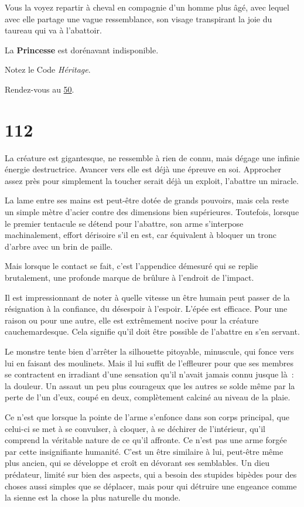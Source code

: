 \documentclass{report}
\newcommand{\gsection}[1]{
    \section{#1}
    \label{section-#1}
}
\newcommand{\glink}[1]{\hyperref[section-#1]{#1}}
\newcommand{\hero}[1]{\textbf{#1}}
\begin{document}
Vous la voyez repartir à cheval en compagnie d'un homme plus âgé, avec lequel avec elle partage une vague ressemblance, son visage transpirant la joie du taureau qui va à l'abattoir.

La \hero{Princesse} est dorénavant indisponible.

Notez le Code \emph{Héritage}.

Rendez-vous au \glink{50}.

\gsection{112}

La créature est gigantesque, ne ressemble à rien de connu, mais dégage une infinie énergie destructrice. Avancer vers elle est déjà une épreuve en soi. Approcher assez près pour simplement la toucher serait déjà un exploit, l'abattre un miracle.

La lame entre ses mains est peut-être dotée de grands pouvoirs, mais cela reste un simple mètre d'acier contre des dimensions bien supérieures. Toutefois, lorsque le premier tentacule se détend pour l'abattre, son arme s'interpose machinalement, effort dérisoire s'il en est, car équivalent à bloquer un tronc d'arbre avec un brin de paille.

Mais lorsque le contact se fait, c'est l'appendice démesuré qui se replie brutalement, une profonde marque de brûlure à l'endroit de l'impact.

Il est impressionnant de noter à quelle vitesse un être humain peut passer de la résignation à la confiance, du désespoir à l'espoir. L'épée est efficace. Pour une raison ou pour une autre, elle est extrêmement nocive pour la créature cauchemardesque. Cela signifie qu'il doit être possible de l'abattre en s'en servant.

Le monstre tente bien d'arrêter la silhouette pitoyable, minuscule, qui fonce vers lui en faisant des moulinets. Mais il lui suffit de l'effleurer pour que ses membres se contractent en irradiant d'une sensation qu'il n'avait jamais connu jusque là : la douleur. Un assaut un peu plus courageux que les autres se solde même par la perte de l'un d'eux, coupé en deux, complètement calciné au niveau de la plaie.

Ce n'est que lorsque la pointe de l'arme s'enfonce dans son corps principal, que celui-ci se met à se convulser, à cloquer, à se déchirer de l'intérieur, qu'il comprend la véritable nature de ce qu'il affronte. Ce n'est pas une arme forgée par cette insignifiante humanité. C'est un être similaire à lui, peut-être même plus ancien, qui se développe et croît en dévorant ses semblables. Un dieu prédateur, limité sur bien des aspects, qui a besoin des stupides bipèdes pour des choses aussi simples que se déplacer, mais pour qui détruire une engeance comme la sienne est la chose la plus naturelle du monde.
\end{document}
